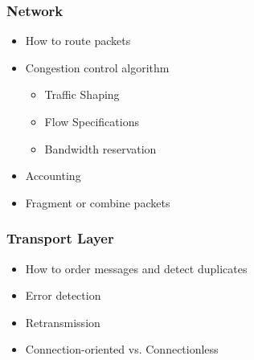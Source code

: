 \subsubsection{Network}\label{subsubsec:Network_Protocols}
\begin{itemize}
\item How to route packets
\item Congestion control algorithm
\begin{itemize}
\item Traffic Shaping
\item Flow Specifications
\item Bandwidth reservation
\end{itemize}
\item Accounting
\item Fragment or combine packets
\end{itemize}

\subsubsection{Transport Layer}\label{subsubsec:Transport_Layer_Protocols}
\begin{itemize}
\item How to order messages and detect duplicates
\item Error detection
\item Retransmission
\item Connection-oriented vs. Connectionless
\end{itemize}



